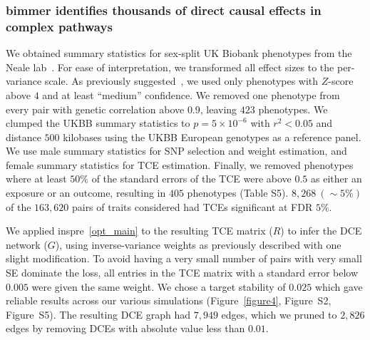 \documentclass{article}
\begin{document}
\subsubsection*{bimmer identifies thousands of direct causal effects in complex pathways}
We obtained summary statistics for sex-split UK Biobank phenotypes from
the Neale lab~\cite{NealeUKBB}. For ease of interpretation,
we transformed all effect sizes to the per-variance scale.
 As previously suggested~\cite{BulikSullivan2015,NealeUKBB},
we used only phenotypes with $Z$-score above $4$ and at least ``medium'' confidence.
 We removed one phenotype from every pair with genetic
correlation above $0.9$, leaving $423$ phenotypes. We clumped the UKBB
summary statistics to $p=5 \times 10^{-6}$ with $r^2 < 0.05$ and distance $500$ kilobases using
the UKBB European genotypes as a reference panel. We use male summary statistics for SNP selection
and weight estimation, and female summary statistics for TCE estimation. Finally, we removed
phenotypes where at least $50\%$ of the standard errors of the TCE were above $0.5$
as either an exposure or an outcome, resulting in $405$ phenotypes (Table S5).
$8,268~(\sim 5\%)$ of the $163,620$ pairs of traits considered had TCEs significant at FDR $5\%$.

We applied inspre~\eqref{opt_main} to the resulting TCE matrix ($R$) to infer the DCE network ($G$),
 using inverse-variance weights
as previously described with one slight modification. To avoid having a very small
number of pairs with very small SE dominate the loss, all entries in the TCE matrix with
a standard error below $0.005$ were given the same weight.
We chose a target stability of $0.025$ which gave reliable results across our various simulations
(Figure~\ref{figure4}, Figure~S2, Figure~S5). The resulting DCE graph had $7,949$ edges,
which we pruned to $2,826$ edges by removing DCEs with absolute value less than $0.01$. 
\end{document}
